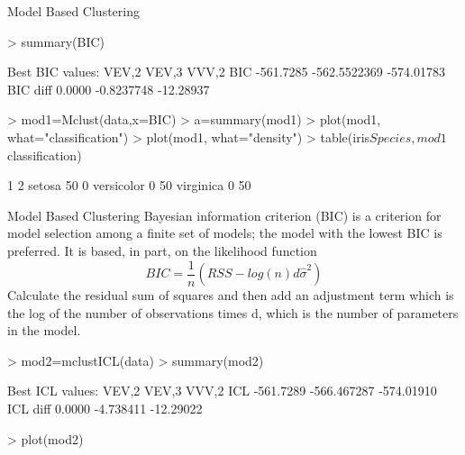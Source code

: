 \documentclass[10pt]{beamer}
\begin{document}
\begin{frame}[fragile]{Model Based Clustering}
\begin{Schunk}
\begin{Sinput}
> summary(BIC)
\end{Sinput}
\begin{Soutput}
Best BIC values:
             VEV,2        VEV,3      VVV,2
BIC      -561.7285 -562.5522369 -574.01783
BIC diff    0.0000   -0.8237748  -12.28937
\end{Soutput}
\begin{Sinput}
> mod1=Mclust(data,x=BIC)
> a=summary(mod1)
> plot(mod1, what="classification")
> plot(mod1, what="density")
> table(iris$Species,mod1$classification)
\end{Sinput}
\begin{Soutput}
              1  2
  setosa     50  0
  versicolor  0 50
  virginica   0 50
\end{Soutput}
\end{Schunk}

\end{frame}

\begin{frame}[fragile]{Model Based Clustering}
Bayesian information criterion (BIC)  is a criterion for model selection among a finite set of models; the model with the lowest BIC is preferred. It is based, in part, on the likelihood function 
\begin{equation}
BIC=\frac{1}{n}(RSS-log(n)d\hat{\sigma}^{2})
\end{equation}
Calculate the residual sum of squares and then add an adjustment term which is the log of the number of observations times d, which is the number of parameters in the model.
\begin{Schunk}
\begin{Sinput}
> mod2=mclustICL(data)
> summary(mod2)
\end{Sinput}
\begin{Soutput}
Best ICL values:
             VEV,2       VEV,3      VVV,2
ICL      -561.7289 -566.467287 -574.01910
ICL diff    0.0000   -4.738411  -12.29022
\end{Soutput}
\begin{Sinput}
> plot(mod2)
\end{Sinput}
\end{Schunk}

\end{frame}
\end{document}
